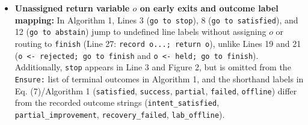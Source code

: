 \documentclass[11pt,a4paper]{article}
\begin{document}
\begin{enumerate}[leftmargin=1.6em,itemsep=3pt]
\begin{itemize}[leftmargin=1.8em,itemsep=2pt]
\item \textbf{Unassigned return variable $o$ on early exits and outcome label mapping:} In Algorithm 1, Lines 3 (\texttt{go to stop}), 8 (\texttt{go to satisfied}), and 12 (\texttt{go to abstain}) jump to undefined line labels without assigning $o$ or routing to \texttt{finish} (Line 27: \texttt{record o...; return o}), unlike Lines 19 and 21 (\texttt{o <- rejected; go to finish} and \texttt{o <- held; go to finish}). Additionally, \texttt{stop} appears in Line 3 and Figure 2, but is omitted from the \texttt{Ensure:} list of terminal outcomes in Algorithm 1, and the shorthand labels in Eq. (7)/Algorithm 1 (\texttt{satisfied}, \texttt{success}, \texttt{partial}, \texttt{failed}, \texttt{offline}) differ from the recorded outcome strings (\texttt{intent\_satisfied}, \texttt{partial\_improvement}, \texttt{recovery\_failed}, \texttt{lab\_offline}).
\end{itemize}
\end{enumerate}
\end{document}
